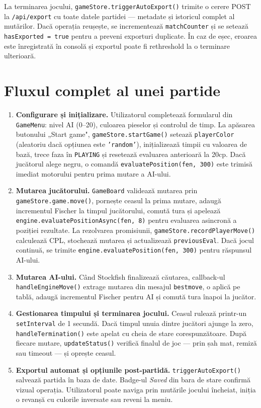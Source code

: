 \documentclass[12pt,a4paper]{article}
\begin{document}
La terminarea jocului, \texttt{gameStore.triggerAutoExport()} trimite o cerere POST la \texttt{/api/export} cu toate datele partidei — metadate și istoricul complet al mutărilor. Dacă operația reușește, se incrementează \texttt{matchCounter} și se setează \texttt{hasExported = true} pentru a preveni exporturi duplicate. În caz de eșec, eroarea este înregistrată în consolă și exportul poate fi rethreshold la o terminare ulterioară.

\newpage
\section{Fluxul complet al unei partide}

\begin{enumerate}
  \item \textbf{Configurare și inițializare.}
  Utilizatorul completează formularul din \texttt{GameMenu}: nivel AI (0–20), culoarea pieselor și controlul de timp. La apăsarea butonului „Start game", \texttt{gameStore.startGame()} setează \texttt{playerColor} (aleatoriu dacă opțiunea este \texttt{'random'}), inițializează timpii cu valoarea de bază, trece faza în \texttt{PLAYING} și resetează evaluarea anterioară la 20cp. Dacă jucătorul alege negru, o comandă \texttt{evaluatePosition(fen, 300)} este trimisă imediat motorului pentru prima mutare a AI-ului.

  \item \textbf{Mutarea jucătorului.}
  \texttt{GameBoard} validează mutarea prin \texttt{gameStore.game.move()}, pornește ceasul la prima mutare, adaugă incrementul Fischer la timpul jucătorului, comută tura și apelează \texttt{engine.evaluatePositionAsync(fen, 8)} pentru evaluarea asincronă a poziției rezultate. La rezolvarea promisiunii, \texttt{gameStore.recordPlayerMove()} calculează CPL, stochează mutarea și actualizează \texttt{previousEval}. Dacă jocul continuă, se trimite \texttt{engine.evaluatePosition(fen, 300)} pentru răspunsul AI-ului.

  \item \textbf{Mutarea AI-ului.}
  Când Stockfish finalizează căutarea, callback-ul \texttt{handleEngineMove()} extrage mutarea din mesajul \texttt{bestmove}, o aplică pe tablă, adaugă incrementul Fischer pentru AI și comută tura înapoi la jucător.

  \item \textbf{Gestionarea timpului și terminarea jocului.}
  Ceasul rulează printr-un \texttt{setInterval} de 1 secundă. Dacă timpul unuia dintre jucători ajunge la zero, \texttt{handleTermination()} este apelat cu cheia de stare corespunzătoare. După fiecare mutare, \texttt{updateStatus()} verifică finalul de joc — prin șah mat, remiză sau timeout — și oprește ceasul.

  \item \textbf{Exportul automat și opțiunile post-partidă.}
  \texttt{triggerAutoExport()} salvează partida în baza de date. Badge-ul \textit{Saved} din bara de stare confirmă vizual operația. Utilizatorul poate naviga prin mutările jocului încheiat, iniția o revanșă cu culorile inversate sau reveni la meniu.
\end{enumerate}
\end{document}
